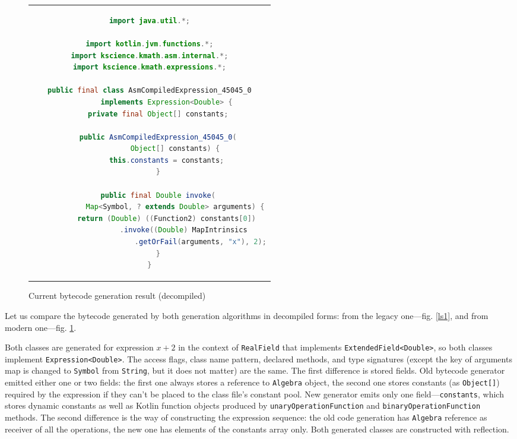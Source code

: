 \documentclass[conference]{IEEEtran}
\begin{document}
\begin{figure}[ht]
    \begin{center}
    \begin{tabular}{c}
    \begin{lstlisting}[language=Java]
import java.util.*;

import kotlin.jvm.functions.*;
import kscience.kmath.asm.internal.*;
import kscience.kmath.expressions.*;

public final class AsmCompiledExpression_45045_0
        implements Expression<Double> {
    private final Object[] constants;

    public AsmCompiledExpression_45045_0(
            Object[] constants) {
        this.constants = constants;
    }

    public final Double invoke(
            Map<Symbol, ? extends Double> arguments) {
        return (Double) ((Function2) constants[0])
                .invoke((Double) MapIntrinsics
                        .getOrFail(arguments, "x"), 2);
    }
}
    \end{lstlisting}
    \end{tabular}
    \end{center}
    \caption{Current bytecode generation result (decompiled)}\label{ls2}
\end{figure}

Let us compare the bytecode generated by both generation algorithms in decompiled forms: from the legacy one---fig. \ref{ls1}, and from modern one---fig. \ref{ls2}.

Both classes are generated for expression $x+2$ in the context of \texttt{RealField} that implements \texttt{ExtendedField<Double>}, so both classes implement \texttt{Expression<Double>}. The access flags, class name pattern, declared methods, and type signatures (except the key of arguments map is changed to \texttt{Symbol} from \texttt{String}, but it does not matter) are the same. The first difference is stored fields. Old bytecode generator emitted either one or two fields: the first one always stores a reference to \texttt{Algebra} object, the second one stores constants (as \texttt{Object[]}) required by the expression if they can't be placed to the class file's constant pool. New generator emits only one field---\texttt{constants}, which stores dynamic constants as well as  Kotlin function objects produced by \texttt{unaryOperationFunction} and \texttt{binaryOperationFunction} methods. The second difference is the way of constructing the expression sequence: the old code generation has \texttt{Algebra} reference as receiver of all the operations, the new one has elements of the constants array only. Both generated classes are constructed with reflection.
\end{document}
